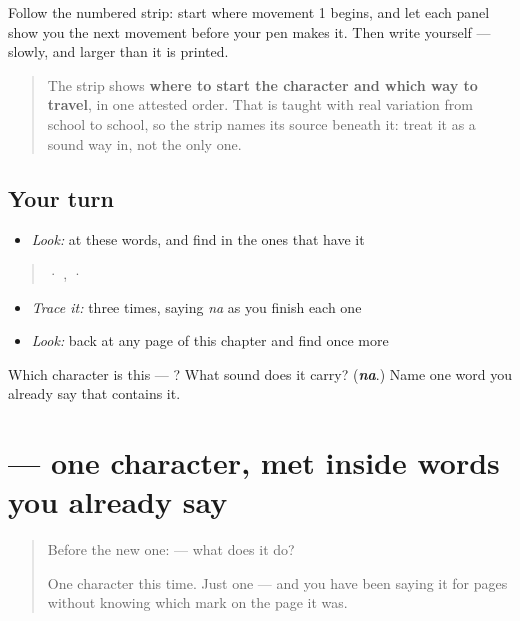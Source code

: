 Follow the numbered strip: start where movement 1 begins, and let each panel show you the next movement before your pen makes it. Then write  yourself — slowly, and larger than it is printed.

\begin{quote}
The strip shows \textbf{where to start the character and which way to travel}, in one attested order. That is taught with real variation from school to school, so the strip names its source beneath it: treat it as a sound way in, not the only one.
\end{quote}

\subsection*{Your turn}
\begin{itemize}
\raggedright
  \item \emph{Look:} at these words, and find  in the ones that have it
\end{itemize}

\begin{quote}
  ·  ,   ·  
\end{quote}

\begin{itemize}
\raggedright
  \item \emph{Trace it:}  three times, saying \emph{na} as you finish each one
  \item \emph{Look:} back at any page of this chapter and find  once more
\end{itemize}

\begin{tcolorbox}[breakable,colback=teal!4,colframe=teal!35!black,title={Before you move on}]
Which character is this — ? What sound does it carry? (\emph{\textbf{na}}.) Name one word you already say that contains it.
\end{tcolorbox}
\section[\texorpdfstring{\hi{क} (ka)}{क (ka)}]{ — one character, met inside words you already say}

\label{lesson:HI-S111-letter-ka}



\begin{quote}
Before the new one:  — what does it do?

One character this time. Just one — and you have been saying it for pages without knowing which mark on the page it was.
\end{quote}

